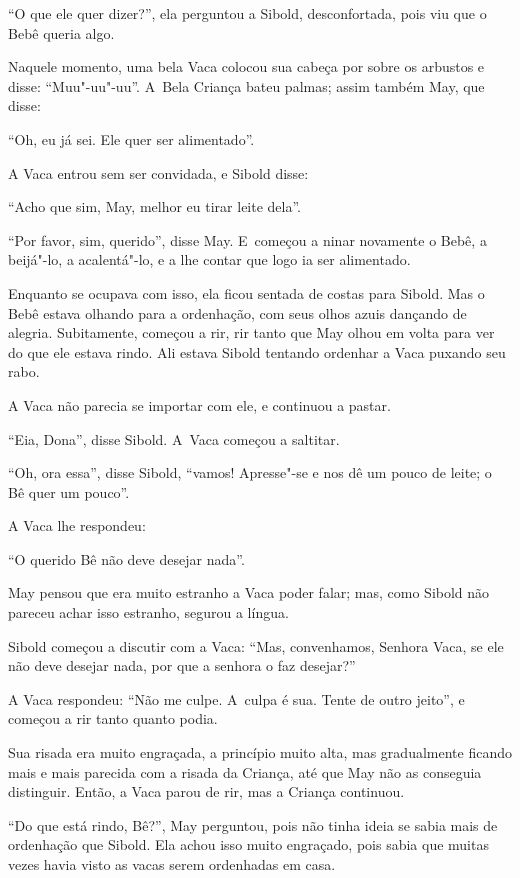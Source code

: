 ``O que ele quer dizer?'', ela perguntou a Sibold, desconfortada, pois
viu que o Bebê queria algo.

Naquele momento, uma bela Vaca colocou sua cabeça por sobre os arbustos
e disse: ``Muu"-uu"-uu''. A~Bela Criança bateu palmas; assim também May,
que disse:

``Oh, eu já sei. Ele quer ser alimentado''.

A Vaca entrou sem ser convidada, e Sibold disse:

``Acho que sim, May, melhor eu tirar leite dela''.

``Por favor, sim, querido'', disse May. E~começou a ninar novamente o
Bebê, a beijá"-lo, a acalentá"-lo, e a lhe contar que logo ia ser
alimentado.

Enquanto se ocupava com isso, ela ficou sentada de costas para Sibold.
Mas o Bebê estava olhando para a ordenhação, com seus olhos azuis
dançando de alegria. Subitamente, começou a rir, rir tanto que May olhou
em volta para ver do que ele estava rindo. Ali estava Sibold tentando
ordenhar a Vaca puxando seu rabo.

A Vaca não parecia se importar com ele, e continuou a pastar.

``Eia, Dona'', disse Sibold. A~Vaca começou a saltitar.

``Oh, ora essa'', disse Sibold, ``vamos! Apresse"-se e nos dê um pouco de
leite; o Bê quer um pouco''.

A Vaca lhe respondeu:

``O querido Bê não deve desejar nada''.

May pensou que era muito estranho a Vaca poder falar; mas, como Sibold
não pareceu achar isso estranho, segurou a língua.

Sibold começou a discutir com a Vaca: ``Mas, convenhamos, Senhora Vaca,
se ele não deve desejar nada, por que a senhora o faz desejar?''

A Vaca respondeu: ``Não me culpe. A~culpa é sua. Tente de outro jeito'',
e começou a rir tanto quanto podia.

Sua risada era muito engraçada, a princípio muito alta, mas gradualmente
ficando mais e mais parecida com a risada da Criança, até que May não as
conseguia distinguir. Então, a Vaca parou de rir, mas a Criança
continuou.

``Do que está rindo, Bê?'', May perguntou, pois não tinha ideia se sabia
mais de ordenhação que Sibold. Ela achou isso muito engraçado, pois
sabia que muitas vezes havia visto as vacas serem ordenhadas em casa.

